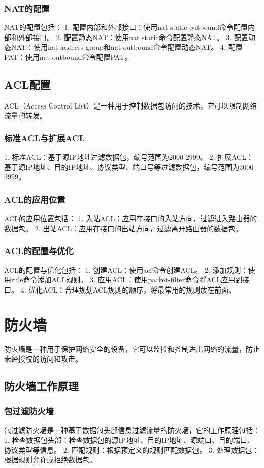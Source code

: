 \documentclass{book}
\begin{document}
\subsubsection{NAT的配置}
NAT的配置包括：
1. 配置内部和外部接口：使用nat static outbound命令配置内部和外部接口。
2. 配置静态NAT：使用nat static命令配置静态NAT。
3. 配置动态NAT：使用nat address-group和nat outbound命令配置动态NAT。
4. 配置PAT：使用nat outbound命令配置PAT。
\subsection{ACL配置}
ACL（Access Control List）是一种用于控制数据包访问的技术，它可以限制网络流量的转发。
\subsubsection{标准ACL与扩展ACL}
1. 标准ACL：基于源IP地址过滤数据包，编号范围为2000-2999。
2. 扩展ACL：基于源IP地址、目的IP地址、协议类型、端口号等过滤数据包，编号范围为3000-3999。
\subsubsection{ACL的应用位置}
ACL的应用位置包括：
1. 入站ACL：应用在接口的入站方向，过滤进入路由器的数据包。
2. 出站ACL：应用在接口的出站方向，过滤离开路由器的数据包。
\subsubsection{ACL的配置与优化}
ACL的配置与优化包括：
1. 创建ACL：使用acl命令创建ACL。
2. 添加规则：使用rule命令添加ACL规则。
3. 应用ACL：使用packet-filter命令将ACL应用到接口。
4. 优化ACL：合理规划ACL规则的顺序，将最常用的规则放在前面。
\section{防火墙}
防火墙是一种用于保护网络安全的设备，它可以监控和控制进出网络的流量，防止未经授权的访问和攻击。
\subsection{防火墙工作原理}
\subsubsection{包过滤防火墙}
包过滤防火墙是一种基于数据包头部信息过滤流量的防火墙，它的工作原理包括：
1. 检查数据包头部：检查数据包的源IP地址、目的IP地址、源端口、目的端口、协议类型等信息。
2. 匹配规则：根据预定义的规则匹配数据包。
3. 处理数据包：根据规则允许或拒绝数据包。
\end{document}
